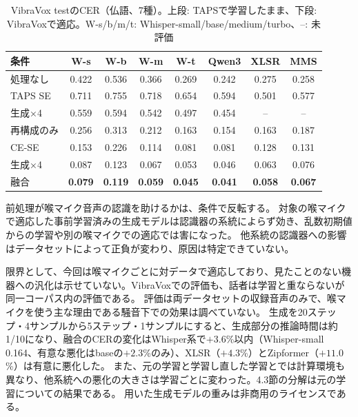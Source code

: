 \documentclass[xelatex,ja=standard,a4paper,twocolumn,10pt]{bxjsarticle}
\makeatletter
\renewcommand{\section}{\@startsection{section}{1}{\z@}{1.0ex plus .3ex}{.5ex}{\normalfont\large\sffamily\bfseries}}
\makeatother
\begin{document}
\begin{table}[t]
  \centering
  \caption{VibraVox testのCER（仏語、7種）。上段: TAPSで学習したまま、下段: VibraVoxで適応。W-s/b/m/t: Whisper-small/base/medium/turbo、--: 未評価}
  \label{tab:vbx}
  \footnotesize
  \setlength{\tabcolsep}{1.6pt}
  \begin{tabular}{lccccccc}
    \toprule
    条件 & W-s & W-b & W-m & W-t & Qwen3 & XLSR & MMS \\
    \midrule
    処理なし & 0.422 & 0.536 & 0.366 & 0.269 & 0.242 & 0.275 & 0.258 \\
    TAPS SE & 0.711 & 0.755 & 0.718 & 0.654 & 0.594 & 0.501 & 0.577 \\
    生成×4 & 0.559 & 0.594 & 0.542 & 0.497 & 0.454 & -- & -- \\
    \midrule
    再構成のみ & 0.256 & 0.313 & 0.212 & 0.163 & 0.154 & 0.163 & 0.187 \\
    CE-SE & 0.153 & 0.226 & 0.114 & 0.081 & 0.081 & 0.128 & 0.131 \\
    生成×4 & 0.087 & 0.123 & 0.067 & 0.053 & 0.046 & 0.063 & 0.076 \\
    融合 & \textbf{0.079} & \textbf{0.119} & \textbf{0.059} & \textbf{0.045} & \textbf{0.041} & \textbf{0.058} & \textbf{0.067} \\
    \bottomrule
  \end{tabular}
\end{table}

\section{考察と限界}
前処理が喉マイク音声の認識を助けるかは、条件で反転する。
対象の喉マイクで適応した事前学習済みの生成モデルは認識器の系統によらず効き、乱数初期値からの学習や別の喉マイクでの適応では害になった。
他系統の認識器への影響はデータセットによって正負が変わり、原因は特定できていない。

限界として、今回は喉マイクごとに対データで適応しており、見たことのない機器への汎化は示せていない。VibraVoxでの評価も、話者は学習と重ならないが同一コーパス内の評価である。
評価は両データセットの収録音声のみで、喉マイクを使う主な理由である騒音下での効果は調べていない。
生成を20ステップ・4サンプルから5ステップ・1サンプルにすると、生成部分の推論時間は約1/10になり、融合のCERの変化はWhisper系で$+3.6$\%以内（Whisper-small 0.164、有意な悪化はbaseの$+2.3$\%のみ）、XLSR（$+4.3$\%）とZipformer（$+11.0$\%）は有意に悪化した。
また、元の学習と学習し直した学習とでは計算環境も異なり、他系統への悪化の大きさは学習ごとに変わった。4.3節の分解は元の学習についての結果である。
用いた生成モデルの重みは非商用のライセンスである。
\end{document}
